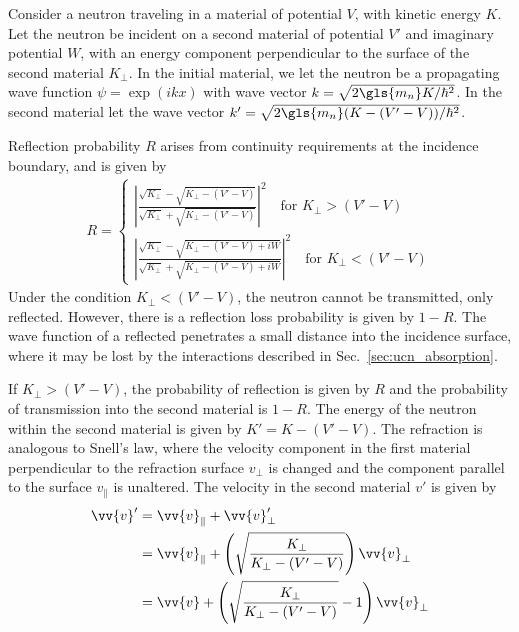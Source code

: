 
Consider a neutron traveling in a material of potential $V$, with kinetic energy $K$. Let the neutron be incident on a second material of potential $V'$ and imaginary potential $W$, with an energy component perpendicular to the surface of the second material $K_\perp$. In the initial material, we let the neutron be a propagating wave function $\psi = \exp (ikx)$ with wave vector $k=\sqrt{2\gls{m_n}K/\hbar^2}$. In the second material let the wave vector $k'=\sqrt{2\gls{m_n}(K-(V'-V))/\hbar^2}$.

Reflection probability $R$ arises from continuity requirements at the incidence boundary, and is given by~\cite{golubUCN, schreyer_thesis}
%
\begin{gather}
    R = \begin{cases}
        \left| \frac{\sqrt{K_\perp}-\sqrt{K_\perp - (V'-V)}}{\sqrt{K_\perp} + \sqrt{K_\perp - (V'-V)}}\right|^2 \quad \text{for } K_\perp > (V'-V) \\
        \left| \frac{\sqrt{K_\perp}-\sqrt{K_\perp - (V'-V) + iW}}{\sqrt{K_\perp} + \sqrt{K_\perp - (V'-V) + iW}} \right|^2 \quad \text{for } K_\perp < (V'-V) \label{eq:loss_on_reflection}
    \end{cases}
\end{gather}
%
Under the condition $K_\perp < (V'-V)$, the neutron cannot be transmitted, only reflected. However, there is a reflection loss probability is given by $1-R$. The wave function of a reflected \ucn penetrates a small distance into the incidence surface, where it may be lost by the interactions described in Sec.~\ref{sec:ucn_absorption}.

If $K_\perp > (V'-V)$, the probability of reflection is given by $R$ and the probability of transmission into the second material is $1-R$. The energy of the neutron within the second material is given by $K'=K-(V'-V)$. The refraction is analogous to Snell's law, where the velocity component in the first material perpendicular to the refraction surface $v_\perp$ is changed and the component parallel to the surface $v_\parallel$ is unaltered. The velocity in the second material $v'$ is given by
%
\begin{align}
    \vv{v}' &= \vv{v}_\parallel+ \vv{v}'_\perp \\
    &= \vv{v}_\parallel + \left( \sqrt{\frac{K_\perp}{K_\perp - (V'-V)}} \right)\vv{v}_\perp \\
    &= \vv{v} + \left( \sqrt{\frac{K_\perp}{K_\perp - (V'-V)}} - 1 \right)\vv{v}_\perp
\end{align}


